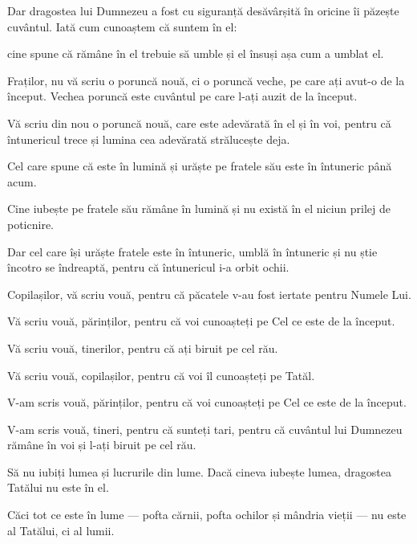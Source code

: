 {Dar dragostea lui Dumnezeu a fost cu siguranță desăvârșită în oricine îi păzește cuvântul. Iată cum cunoaștem că suntem în el:

cine spune că rămâne în el trebuie să umble și el însuși așa cum a umblat el.


\par }{\PP {}Fraților, nu vă scriu o poruncă nouă, ci o poruncă veche, pe care ați avut-o de la început. Vechea poruncă este cuvântul pe care l-ați auzit de la început.

Vă scriu din nou o poruncă nouă, care este adevărată în el și în voi, pentru că întunericul trece și lumina cea adevărată strălucește deja.

Cel care spune că este în lumină și urăște pe fratele său este în întuneric până acum.

Cine iubește pe fratele său rămâne în lumină și nu există în el niciun prilej de poticnire.

Dar cel care își urăște fratele este în întuneric, umblă în întuneric și nu știe încotro se îndreaptă, pentru că întunericul i-a orbit ochii.


\par }{\PP {}Copilașilor, vă scriu vouă, pentru că păcatele v-au fost iertate pentru Numele Lui.


\par }{\PP {}Vă scriu vouă, părinților, pentru că voi cunoașteți pe Cel ce este de la început.

\par }{\PP Vă scriu vouă, tinerilor, pentru că ați biruit pe cel rău.

\par }{\PP Vă scriu vouă, copilașilor, pentru că voi îl cunoașteți pe Tatăl.


\par }{\PP {}V-am scris vouă, părinților, pentru că voi cunoașteți pe Cel ce este de la început.

\par }{\PP V-am scris vouă, tineri, pentru că sunteți tari, pentru că cuvântul lui Dumnezeu rămâne în voi și l-ați biruit pe cel rău.


\par }{\PP {}Să nu iubiți lumea și lucrurile din lume. Dacă cineva iubește lumea, dragostea Tatălui nu este în el.

Căci tot ce este în lume — pofta cărnii, pofta ochilor și mândria vieții — nu este al Tatălui, ci al lumii.

}
